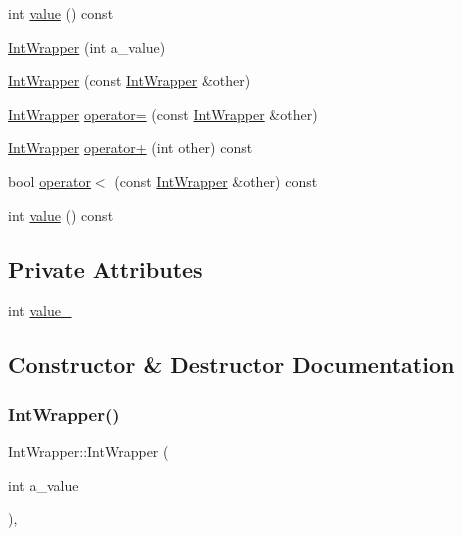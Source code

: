 \begin{DoxyCompactItemize}
\item 
int \mbox{\hyperlink{class_int_wrapper_a6103e9dc5eb94678985e3c2ac481b508}{value}} () const
\item 
\mbox{\hyperlink{class_int_wrapper_a1d35e0d0b9c0fc109a8d2a2118ae6010}{Int\+Wrapper}} (int a\+\_\+value)
\item 
\mbox{\hyperlink{class_int_wrapper_af23efe3c8d8bf176948922b41e8f253e}{Int\+Wrapper}} (const \mbox{\hyperlink{class_int_wrapper}{Int\+Wrapper}} \&other)
\item 
\mbox{\hyperlink{class_int_wrapper}{Int\+Wrapper}} \mbox{\hyperlink{class_int_wrapper_a39077b3c0eb1dd8a296a81bfb0a047b3}{operator=}} (const \mbox{\hyperlink{class_int_wrapper}{Int\+Wrapper}} \&other)
\item 
\mbox{\hyperlink{class_int_wrapper}{Int\+Wrapper}} \mbox{\hyperlink{class_int_wrapper_abf97bd11dd2825f3cb9e4d9f48152b56}{operator+}} (int other) const
\item 
bool \mbox{\hyperlink{class_int_wrapper_a940fd2978cdf7849281f11b32df94163}{operator$<$}} (const \mbox{\hyperlink{class_int_wrapper}{Int\+Wrapper}} \&other) const
\item 
int \mbox{\hyperlink{class_int_wrapper_a6103e9dc5eb94678985e3c2ac481b508}{value}} () const
\end{DoxyCompactItemize}
\subsection*{Private Attributes}
\begin{DoxyCompactItemize}
\item 
int \mbox{\hyperlink{class_int_wrapper_a9695c22c2bcd5a7bc2775cf6e3a6e33a}{value\+\_\+}}
\end{DoxyCompactItemize}


\subsection{Constructor \& Destructor Documentation}
\mbox{\label{class_int_wrapper_a1d35e0d0b9c0fc109a8d2a2118ae6010}} 
\subsubsection{\texorpdfstring{IntWrapper()}{IntWrapper()}\hspace{0.1cm}{\footnotesize\ttfamily [1/6]}}
{\footnotesize\ttfamily Int\+Wrapper\+::\+Int\+Wrapper (\begin{DoxyParamCaption}\item[{int}]{a\+\_\+value }\end{DoxyParamCaption})\hspace{0.3cm}{\ttfamily [inline]}, {\ttfamily [explicit]}}

